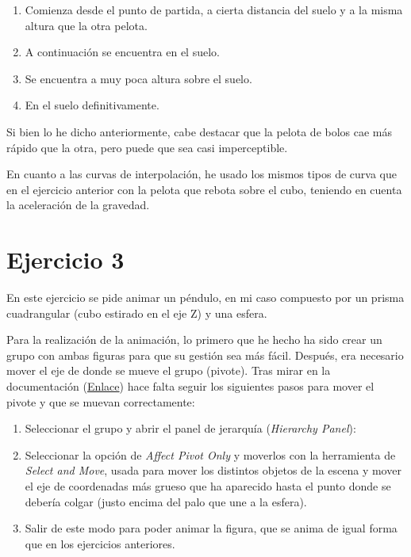 \documentclass{article}
\begin{document}
\begin{enumerate}
    \item Comienza desde el punto de partida, a cierta distancia del suelo y a la misma altura que la otra pelota.
    \item A continuación se encuentra en el suelo.
    \item Se encuentra a muy poca altura sobre el suelo.
    \item En el suelo definitivamente.
\end{enumerate}


Si bien lo he dicho anteriormente, cabe destacar que la pelota de bolos cae más rápido que la otra, pero puede que sea casi imperceptible.

En cuanto a las curvas de interpolación, he usado los mismos tipos de curva que en el ejercicio anterior con la pelota que rebota sobre el cubo, teniendo en cuenta la aceleración de la gravedad. 



\section{Ejercicio 3}

En este ejercicio se pide animar un péndulo, en mi caso compuesto por un prisma cuadrangular (cubo estirado en el eje Z) y una esfera.


Para la realización de la animación, lo primero que he hecho ha sido crear un grupo con ambas figuras para que su gestión sea más fácil. Después, era necesario mover el eje de donde se mueve el grupo (pivote). Tras mirar en la documentación (\href{https://knowledge.autodesk.com/support/3ds-max/learn-explore/caas/CloudHelp/cloudhelp/2021/ENU/3DSMax-Animation/files/GUID-6872F014-4785-43D9-A83B-C774507907B3-htm.html}{Enlace}) hace falta seguir los siguientes pasos para mover el pivote y que se muevan correctamente:

\begin{enumerate}
    \item Seleccionar el grupo y abrir el panel de jerarquía (\textit{Hierarchy Panel}):
    

    \item Seleccionar la opción de \textit{Affect Pivot Only} y moverlos con la herramienta de \textit{Select and Move}, usada para mover los distintos objetos de la escena y mover el eje de coordenadas más grueso que ha aparecido hasta el punto donde se debería colgar (justo encima del palo que une a la esfera).
    

    \item Salir de este modo para poder animar la figura, que se anima de igual forma que en los ejercicios anteriores.
\end{enumerate}
\end{document}
